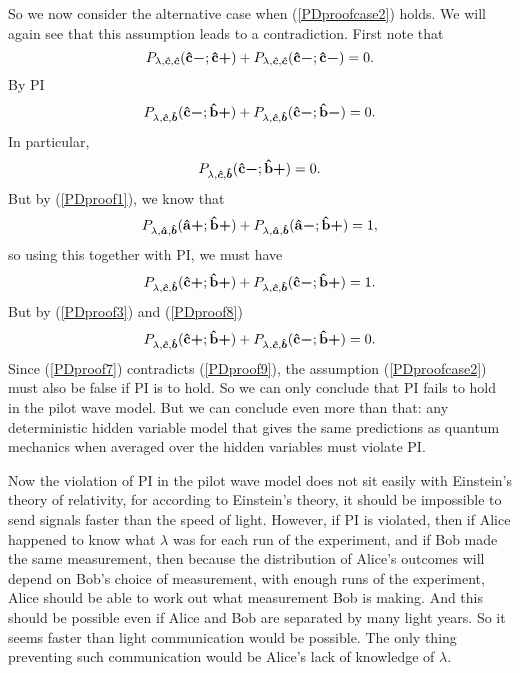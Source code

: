 So we now consider the alternative case when (\ref{PDproofcase2}) holds. We will again see that this assumption leads to a contradiction. First note that
\begin{equation}
 P_{\lambda,\bm{\hat{c}},\bm{\hat{c}}}(\vb{\hat{{c}}}\bm{-};\vb{\hat{{c}}}\bm{+})+P_{\lambda,\bm{\hat{c}},\bm{\hat{c}}}(\vb{\hat{{c}}}\bm{-};\vb{\hat{{c}}}\bm{-})=0.
\end{equation}
 By PI
\begin{equation}
P_{\lambda,\bm{\hat{c}},\bm{\hat{b}}}(\vb{\hat{{c}}}\bm{-};\vb{\hat{{b}}}\bm{+})+P_{\lambda,\bm{\hat{c}},\bm{\hat{b}}}(\vb{\hat{{c}}}\bm{-};\vb{\hat{{b}}}\bm{-})=0.
\end{equation}
In particular, 
\begin{equation}\label{PDproof8}
P_{\lambda,\bm{\hat{c}},\bm{\hat{b}}}(\vb{\hat{{c}}}\bm{-};\vb{\hat{{b}}}\bm{+})=0.
\end{equation}
   But by (\ref{PDproof1}), we know that 
  \begin{equation}
  P_{\lambda,\bm{\hat{a}},\bm{\hat{b}}}(\vb{\hat{{a}}}\bm{+};\vb{\hat{{b}}}\bm{+})+P_{\lambda,\bm{\hat{a}},\bm{\hat{b}}}(\vb{\hat{{a}}}\bm{-};\vb{\hat{{b}}}\bm{+})=1,
  \end{equation}   
 so using this together with PI, we must have
    \begin{equation}\label{PDproof7}
  P_{\lambda,\bm{\hat{c}},\bm{\hat{b}}}(\vb{\hat{{c}}}\bm{+};\vb{\hat{{b}}}\bm{+})+P_{\lambda,\bm{\hat{c}},\bm{\hat{b}}}(\vb{\hat{{c}}}\bm{-};\vb{\hat{{b}}}\bm{+})=1.
  \end{equation} 
   But by (\ref{PDproof3}) and (\ref{PDproof8})
\begin{equation}\label{PDproof9}
 P_{\lambda,\bm{\hat{c}},\bm{\hat{b}}}(\vb{\hat{{c}}}\bm{+};\vb{\hat{{b}}}\bm{+})+P_{\lambda,\bm{\hat{c}},\bm{\hat{b}}}(\vb{\hat{{c}}}\bm{-};\vb{\hat{{b}}}\bm{+})=0.
\end{equation}
Since (\ref{PDproof7}) contradicts (\ref{PDproof9}), the assumption (\ref{PDproofcase2}) must also be false if PI is to hold. So we can only conclude that PI fails to hold in the pilot wave model.   But we can conclude even more than that: any deterministic hidden variable model that gives the same predictions as quantum mechanics when averaged over the hidden variables must violate PI.\label{PIdeterminism} 

Now the violation of PI in the pilot wave model does not sit easily with Einstein's theory of relativity, for according to Einstein's theory, it should be impossible to send signals faster than the speed of light. However, if PI is violated, then if Alice happened to know what $\lambda$ was for each run of the experiment, and if Bob made the same measurement, then because the distribution of Alice's outcomes will depend on Bob's choice of measurement, with enough runs of the experiment, Alice should be able to work out what measurement Bob is making. And this should be possible even if Alice and Bob are separated by many light years. So it seems faster than light communication would be possible. The only thing preventing such communication would be Alice's lack of knowledge of $\lambda$. 

